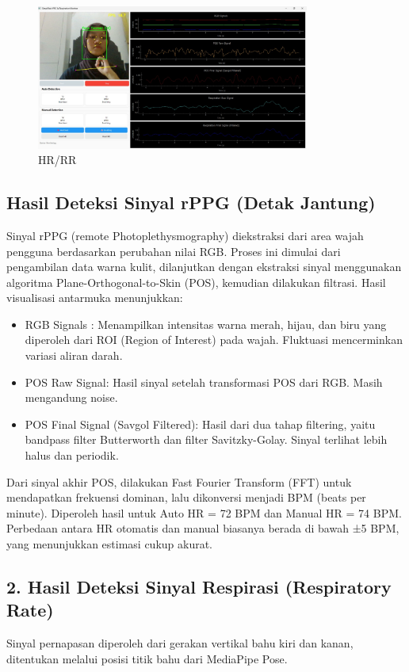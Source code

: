\documentclass[11pt,a4paper]{article}
\begin{document}
    \begin{figure}[h]
    \centering
    \includegraphics[width=0.8\textwidth]{Figure/monitoring.jpg}
    \caption{HR/RR}
    \label{fig:my_label}
    \end{figure}

\subsection{Hasil Deteksi Sinyal rPPG (Detak Jantung)}
    Sinyal rPPG (remote Photoplethysmography) diekstraksi dari area wajah pengguna berdasarkan perubahan nilai RGB. Proses ini dimulai dari pengambilan data warna kulit, dilanjutkan dengan ekstraksi sinyal menggunakan algoritma Plane-Orthogonal-to-Skin (POS), kemudian dilakukan filtrasi.
    Hasil visualisasi antarmuka menunjukkan:
    \begin{itemize}
    \item RGB Signals : Menampilkan intensitas warna merah, hijau, dan biru yang diperoleh dari ROI (Region of Interest) pada wajah. Fluktuasi mencerminkan variasi aliran darah.
    \item POS Raw Signal: Hasil sinyal setelah transformasi POS dari RGB. Masih mengandung noise.
    \item POS Final Signal (Savgol Filtered): Hasil dari dua tahap filtering, yaitu bandpass filter Butterworth dan filter Savitzky-Golay. Sinyal terlihat lebih halus dan periodik.
    \end{itemize}

Dari sinyal akhir POS, dilakukan Fast Fourier Transform (FFT) untuk mendapatkan frekuensi dominan, lalu dikonversi menjadi BPM (beats per minute). Diperoleh hasil untuk  Auto HR = 72 BPM dan Manual HR = 74 BPM. Perbedaan antara HR otomatis dan manual biasanya berada di bawah ±5 BPM, yang menunjukkan estimasi cukup akurat.

\subsection{2. Hasil Deteksi Sinyal Respirasi (Respiratory Rate)}
Sinyal pernapasan diperoleh dari gerakan vertikal bahu kiri dan kanan, ditentukan melalui posisi titik bahu dari MediaPipe Pose.
\end{document}
